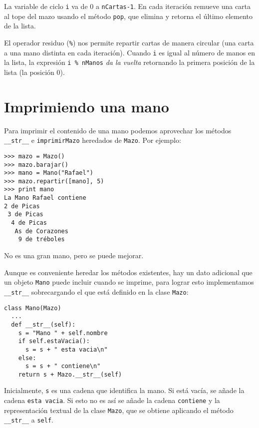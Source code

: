 
La variable de ciclo \texttt{i} va de 0 a \texttt{nCartas-1}.  En
cada iteración remueve una carta al tope del mazo usando el 
método \texttt{pop}, que elimina y retorna el último elemento
de la lista.


El operador residuo  (\texttt{\%}) nos permite repartir cartas de
manera circular (una carta a una mano distinta en cada iteración). 
Cuando \texttt{i} es igual al número de manos en la lista, la 
expresión \texttt{i \% nManos} \textit{da la vuelta} retornando
la primera posición de la lista (la posición 0).



\section {Imprimiendo una mano}

Para imprimir el contenido de una mano podemos aprovechar los
métodos \texttt{\_\_str\_\_} e \texttt{imprimirMazo}  heredados
de  \texttt{Mazo}.  Por ejemplo:


\beforeverb
\begin{verbatim}
>>> mazo = Mazo()
>>> mazo.barajar()
>>> mano = Mano("Rafael")
>>> mazo.repartir([mano], 5)
>>> print mano
La Mano Rafael contiene
2 de Picas
 3 de Picas
  4 de Picas
   As de Corazones
    9 de tréboles
\end{verbatim}
\afterverb
%
No es una gran mano, pero se puede mejorar.


Aunque es conveniente heredar los métodos existentes, hay
un dato adicional que un objeto  \texttt{Mano} puede incluir
cuando se imprime, para lograr esto implementamos \texttt{\_\_str\_\_} 
sobrecargando el que está definido en la clase \texttt{Mazo}:

\beforeverb
\begin{verbatim}
class Mano(Mazo)
  ...
  def __str__(self):
    s = "Mano " + self.nombre
    if self.estaVacia():
      s = s + " esta vacia\n"
    else:
      s = s + " contiene\n"
    return s + Mazo.__str__(self)
\end{verbatim}
\afterverb
%
Inicialmente, \texttt{s} es una cadena que identifica la mano. Si 
está vacía, se añade la cadena \texttt{esta vacia}. Si esto no es 
así se añade la cadena  \texttt{contiene} y la representación 
textual de la clase  \texttt{Mazo}, que se obtiene aplicando el 
método {\tt\_\_str\_\_} a \texttt{self}.

